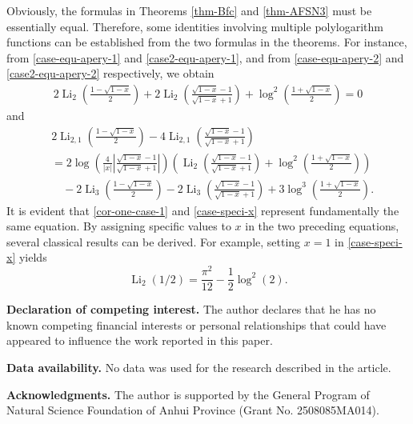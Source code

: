\documentclass[11pt]{article}
\DeclareMathOperator{\Li}{Li}
\theoremstyle{plain}
\theoremstyle{definition}
\begin{document}
Obviously, the formulas in Theorems \ref{thm-Bfc} and \ref{thm-AFSN3} must be essentially equal. Therefore, some identities involving multiple polylogarithm functions can be established from the two formulas in the theorems. For instance, from \eqref{case-equ-apery-1} and \eqref{case2-equ-apery-1}, and from \eqref{case-equ-apery-2} and \eqref{case2-equ-apery-2} respectively, we obtain
\begin{align}\label{case-speci-x}
2\Li_2\left(\frac{1-\sqrt{1-x}}{2}\right)+2\Li_{2}\left(\frac{\sqrt{1-x}-1}{\sqrt{1-x}+1}\right)+\log^2\left(\frac{1+\sqrt{1-x}}{2}\right)=0
\end{align}
and
\begin{align}
&2\Li_{2,1}\left(\frac{1-\sqrt{1-x}}{2}\right)-4\Li_{2,1}\left(\frac{\sqrt{1-x}-1}{\sqrt{1-x}+1}\right)\nonumber\\
&=2\log\left(\frac{4}{|x|}\left\vert\frac{\sqrt{1-x}-1}{\sqrt{1-x}+1}\right\vert\right)\left(\Li_{2}\left(\frac{\sqrt{1-x}-1}{\sqrt{1-x}+1}\right)
+\log^2\left(\frac{1+\sqrt{1-x}}{2}\right)\right)\nonumber\\
&\quad-2\Li_3\left(\frac{1-\sqrt{1-x}}{2}\right)-2\Li_{3}\left(\frac{\sqrt{1-x}-1}{\sqrt{1-x}+1}\right)+3\log^3\left(\frac{1+\sqrt{1-x}}{2}\right).
\end{align}
It is evident that \eqref{cor-one-case-1} and \eqref{case-speci-x} represent fundamentally the same equation.
By assigning specific values to $x$ in the two preceding equations, several classical results can be derived. For example, setting $x=1$ in \eqref{case-speci-x} yields
\[\Li_2(1/2)=\frac{\pi^2}{12}-\frac1{2}\log^2(2).\]


{\bf Declaration of competing interest.}
The author declares that he has no known competing financial interests or personal relationships that could have
appeared to influence the work reported in this paper.

{\bf Data availability.}
No data was used for the research described in the article.

{\bf Acknowledgments.}  The author is supported by the General Program of Natural Science Foundation of Anhui Province (Grant No. 2508085MA014).


\medskip
\end{document}
